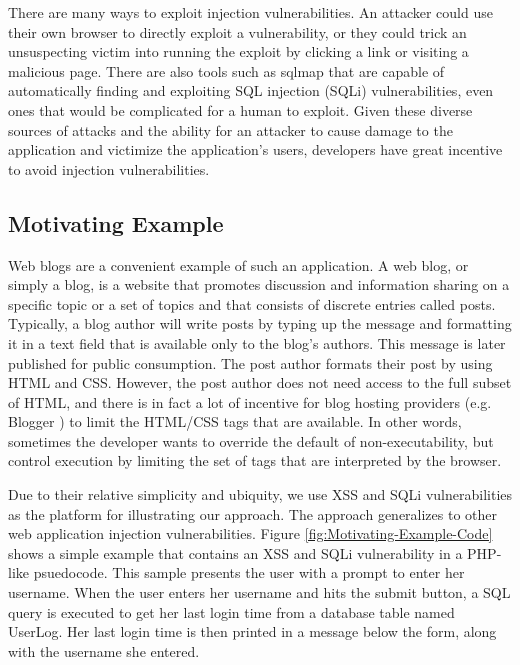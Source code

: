 There are many ways to exploit injection vulnerabilities. An attacker could use their own browser to directly exploit a vulnerability, or they could trick an unsuspecting victim into running the exploit by clicking a link or visiting a malicious page. There are also tools such as sqlmap \cite{sqlmap} that are capable of automatically finding
and exploiting SQL injection (SQLi) vulnerabilities, even ones that would
be complicated for a human to exploit. Given these diverse sources
of attacks and the ability for an attacker to cause damage to the
application and victimize the application's users, developers have
great incentive to avoid injection vulnerabilities.


\subsection{Motivating Example}


Web blogs are a convenient
example of such an application. A web blog, or simply a blog, is a
website that promotes discussion and information sharing on a specific
topic or a set of topics and that consists of discrete entries called posts.
Typically, a blog author will write posts by typing up the message
and formatting it in a text field that is available only to the blog's
authors. This message is later published for public consumption. The
post author formats their post by using HTML and CSS. However, the
post author does not need access to the full subset of HTML, and there
is in fact a lot of incentive for blog hosting providers (e.g. Blogger
\cite{blogger}) to limit the HTML/CSS tags that are available. In other words, sometimes the developer wants to override the default of non-executability, but control execution by limiting the set of tags that are interpreted by the browser.

Due to their relative simplicity and ubiquity, we use XSS and SQLi
vulnerabilities as the platform for illustrating our approach. The
approach generalizes to other web application injection vulnerabilities.
Figure \ref{fig:Motivating-Example-Code} shows a simple example that
contains an XSS and SQLi vulnerability in a PHP-like psuedocode. This
sample presents the user with a prompt to enter her username. When
the user enters her username and hits the submit button, a SQL query
is executed to get her last login time from a database table named
UserLog. Her last login time is then printed in a message below
the form, along with the username she entered. 

